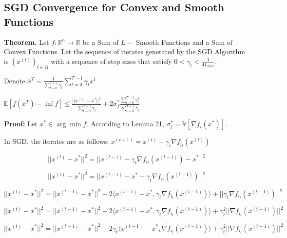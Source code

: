 \subsection{SGD Convergence for Convex and Smooth Functions}
\noindent \textbf{Theorem.} Let $f: \mathbb{R}^n \rightarrow \mathbb{R}$ be a Sum of $L-$ Smooth Functions and a Sum of Convex Functions.  Let the sequence of iterates generated by the SGD Algorithm is $(x^{(t)})_{t \in \mathbb{N}}$ with a sequence of step sizes that satisfy $0 < \gamma_t < \frac{1}{4L_{max}}$. 

\noindent Denote $\bar{x}^T = \frac{1}{\sum_{t = 0}^{T - 1} \gamma_t} \sum_{t = 0}^{T - 1} \gamma_t x^t$ \newline 

\noindent $\mathbb{E}[f(\bar{x}^T) - \inf f] \leq \frac{||x^{(0)} - x^*||^2}{\sum_{t = 0}^{T - 1} \gamma_t} + 2\sigma_f^* \frac{\sum_{t = 0}^{T - 1} \gamma_t^2}{\sum_{t = 0}^{T - 1} \gamma_t}$

\noindent \textbf{Proof:} \newline 
\noindent Let $x^* \in \arg \min f$. According to Lemma 21, $\sigma_f^* = \mathbb{V}[\nabla f_i(x^*)]$. 

\noindent In SGD, the iterates are as follows: $x^{(t + 1)}  = x^{(t)} - \gamma_t \nabla f_{i_t}(x^{(t)})$  

\begin{equation}
    ||x^{(t)} - x^*||^2 = ||x^{(t - 1)} - \gamma_t \nabla f_{i_t}(x^{(t - 1)}) - x^*||^2
\end{equation}

\begin{equation}
    ||x^{(t)} - x^*||^2 = ||x^{(t - 1)} - x^* - \gamma_t \nabla f_{i_t}(x^{(t - 1)})||^2
\end{equation}

\begin{equation}
    ||x^{(t)} - x^*||^2 = ||x^{(t - 1)} - x^*||^2 - 2\langle x^{(t - 1)} - x^*,  \gamma_t \nabla f_{i_t}(x^{(t - 1)})\rangle + ||\gamma_t \nabla f_{i_t}(x^{(t - 1)})||^2
\end{equation}

\begin{equation}
    ||x^{(t)} - x^*||^2 = ||x^{(t - 1)} - x^*||^2 - 2\langle x^{(t - 1)} - x^*,  \gamma_t \nabla f_{i_t}(x^{(t - 1)})\rangle + \gamma_t^2 ||\nabla f_{i_t}(x^{(t - 1)})||^2
\end{equation}

\begin{equation}
    ||x^{(t)} - x^*||^2 = ||x^{(t - 1)} - x^*||^2 - 2\gamma_t \langle x^{(t - 1)} - x^*,  \nabla f_{i_t}(x^{(t - 1)})\rangle + \gamma_t^2 ||\nabla f_{i_t}(x^{(t - 1)})||^2
\end{equation}


